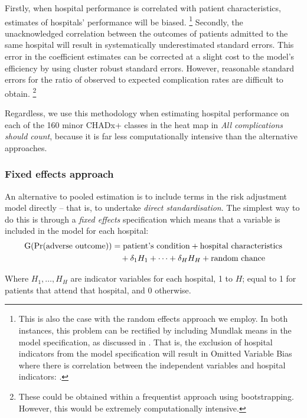 \documentclass[submission]{grattan}
\newcommand*{\myTitle}{All complications should count}
\begin{document}
Firstly, when hospital performance is correlated with patient characteristics, estimates of hospitals' performance will be biased.%
\footnote{This is also the case with the random effects approach we employ.
	In both instances, this problem can be rectified by including Mundlak means in the model specification, as discussed in . 
	That is, the exclusion of hospital indicators from the model specification will result in Omitted Variable Bias where there is correlation between the independent variables and hospital indicators: \textcite{Cameron-Trivedi-Microeconometrics-methods}.}
Secondly, the unacknowledged correlation between the outcomes of patients admitted to the same hospital will result in systematically underestimated standard errors.
This error in the coefficient estimates can be corrected at a slight cost to the model's efficiency by using cluster robust standard errors.
However, reasonable standard errors for the ratio of observed to expected complication rates are difficult to obtain.%
	\footnote{These could be obtained within a frequentist approach using bootstrapping.
	However, this would be extremely computationally intensive.}

Regardless, we use this methodology when estimating hospital performance on each of the 160 minor CHADx+ classes in the heat map in \textit{\myTitle}, because it is far less computationally intensive than the alternative approaches.

\subsubsection{Fixed effects approach}\label{subsubsec:fixed-effects-approach}

An alternative to pooled estimation is to include terms in the risk adjustment model directly -- that is, to undertake \emph{direct standardisation}.
The simplest way to do this is through a \emph{fixed effects} specification which means that a variable is included in the model for each hospital:
\begin{align*}
\operatorname{G}(\Pr(\text{adverse outcome})) &= \text{patient's condition} + \text{hospital\ characteristics} \\\relax
&\quad{}+ \delta_{1}H_{1} + \dots + \delta_{H}H_{H} + \text{random chance}
\end{align*}

Where \(H_{1},\dots,H_{H}\) are indicator variables for each hospital, 1 to \(H\); equal to 1 for patients that attend that hospital, and 0 otherwise.
\end{document}
